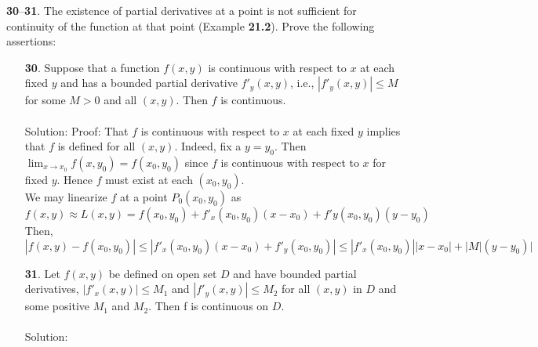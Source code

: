 \documentclass[12pt]{amsbook}
\begin{document}
\noindent
{\small {\bf 30}--{\bf 31}}. The existence of partial derivatives at a point is not sufficient for
continuity of the function at that point (Example {\bf 21.2}). Prove the following
assertions:
\begin{enumerate}
\item[{\small\bf 30}.] Suppose that a function $f(x, y)$ is continuous with respect to $x$
at each fixed $y$ and has a bounded partial derivative $f'_y(x,y)$, i.e., $|f'_y(x,y)|\leq M$ for some $M > 0$ and all $(x, y)$. Then $f$ is continuous.
\\
\\
{\sc Solution}: Proof: That $f$ is continuous with respect to $x$ at each fixed $y$ implies that $f$ is defined for all $(x,y)$. Indeed, fix a $y=y_0$. Then $\lim_{x \rightarrow x_0}f(x,y_0)=f(x_0,y_0)$ since $f$ is continuous with respect to $x$ for fixed $y$. Hence $f$ must exist at each $(x_0,y_0)$. 
\\
We may linearize $f$ at a point $P_0(x_0,y_0)$ as 
$$f(x,y) \approx L(x,y)=f(x_0,y_0)+f'_x(x_0,y_0)(x-x_0)+f'y(x_0,y_0)(y-y_0)$$
Then,
$$|f(x,y)-f(x_0,y_0)|\leq |f'_x(x_0,y_0)(x-x_0)+f'_y(x_0,y_0)|\leq |f'_x(x_0,y_0)||x-x_0|+|M
|(y-y_0)|$$
\item[{\small\bf 31}.] Let $f(x, y)$ be defined on open set $D$ and have bounded partial
derivatives, $|f'_x(x,y)|\leq M_1$ and $|f'_y(x,y)|\leq M_2$ for all $(x, y)$ in $D$
and some positive $M_1$ and $M_2$. Then f is continuous on $D$.
\\
\\
{\sc Solution}: 
\end{enumerate}


\newpage
\end{document}
